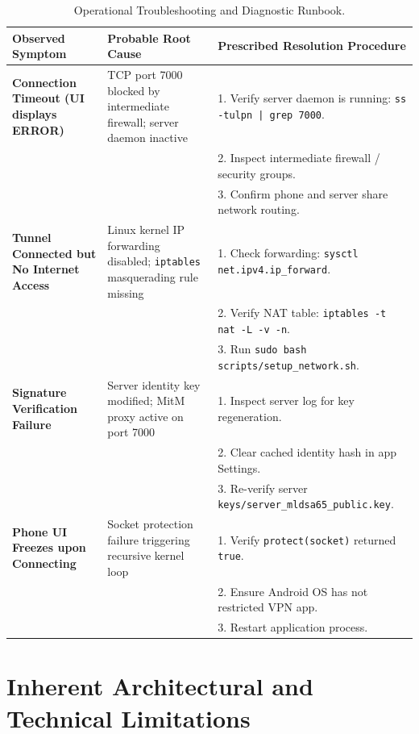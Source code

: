 \begin{table}[htbp]
  \centering
  \small
  \caption{Operational Troubleshooting and Diagnostic Runbook.}
  \label{tab:troubleshooting_guide}
  \begin{tabular}{@{}P{3.2cm}P{4.2cm}P{5.8cm}@{}}
    \toprule
    \textbf{Observed Symptom} & \textbf{Probable Root Cause} & \textbf{Prescribed Resolution Procedure} \\
    \midrule
    \textbf{Connection Timeout (UI displays ERROR)} & TCP port 7000 blocked by intermediate firewall; server daemon inactive & 1. Verify server daemon is running: \texttt{ss -tulpn | grep 7000}.\\ & & 2. Inspect intermediate firewall / security groups.\\ & & 3. Confirm phone and server share network routing. \\
    \addlinespace
    \textbf{Tunnel Connected but No Internet Access} & Linux kernel IP forwarding disabled; \texttt{iptables} masquerading rule missing & 1. Check forwarding: \texttt{sysctl net.ipv4.ip\_forward}.\\ & & 2. Verify NAT table: \texttt{iptables -t nat -L -v -n}.\\ & & 3. Run \texttt{sudo bash scripts/setup\_network.sh}. \\
    \addlinespace
    \textbf{Signature Verification Failure} & Server identity key modified; MitM proxy active on port 7000 & 1. Inspect server log for key regeneration.\\ & & 2. Clear cached identity hash in app Settings.\\ & & 3. Re-verify server \texttt{keys/server\_mldsa65\_public.key}. \\
    \addlinespace
    \textbf{Phone UI Freezes upon Connecting} & Socket protection failure triggering recursive kernel loop & 1. Verify \texttt{protect(socket)} returned \texttt{true}.\\ & & 2. Ensure Android OS has not restricted VPN app.\\ & & 3. Restart application process. \\
    \bottomrule
  \end{tabular}
\end{table}

\section{Inherent Architectural and Technical Limitations}
\label{sec:system_limitations}

